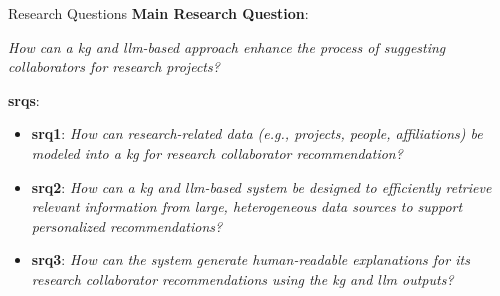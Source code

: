 \begin{frame}{Research Questions}
\textbf{Main Research Question}:
\begin{center}
	\textit{How can a \gls{kg} and \gls{llm}-based approach enhance the process of suggesting collaborators for research projects?}
\end{center}
\vspace{.2cm}
\textbf{\glspl{srq}}:
\small{
\begin{itemize}
	\item \textbf{\gls{srq}1}: \textit{How can research-related data (e.g., projects, people, affiliations) be modeled into a \gls{kg} for research collaborator recommendation?}
    \item \textbf{\gls{srq}2}: \textit{How can a \gls{kg} and \gls{llm}-based system be designed to efficiently retrieve relevant information from large, heterogeneous data sources to support personalized recommendations?}
    \item \textbf{\gls{srq}3}: \textit{How can the system generate human-readable explanations for its research collaborator recommendations using the \gls{kg} and \gls{llm} outputs?}
\end{itemize}
}
\end{frame}